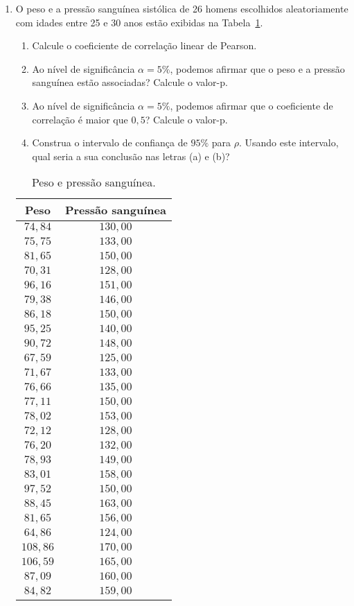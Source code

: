 \documentclass[8pt, a4paper]{article}
\begin{document}
\begin{enumerate}
	\item O peso e a pressão sanguínea sistólica de 26 homens escolhidos aleatoriamente com idades entre 25 e 30 anos estão exibidas na Tabela~\ref{tab:E11-8}.
	\begin{enumerate}
		\item Calcule o coeficiente de correlação linear de Pearson.
		\item Ao nível de significância $\alpha=5\%$, podemos afirmar que o peso e a pressão sanguínea estão associadas? Calcule o valor-p.
		\item Ao nível de significância $\alpha=5\%$, podemos afirmar que o coeficiente de correlação é maior que $0,5$? Calcule o valor-p.
		\item Construa o intervalo de confiança de $95\%$ para $\rho$. Usando este intervalo, qual seria a sua conclusão nas letras (a) e (b)?
	\end{enumerate}
	\begin{table}[htbp]
		\centering
		\caption{Peso e pressão sanguínea.}
		\label{tab:E11-8}
		\begin{tabular}{cc}
			\toprule
			\textbf{Peso} & \textbf{Pressão sanguínea} \\ 
			\midrule
			$74,84$ & $130,00$ \\ 
			$75,75$ & $133,00$ \\ 
			$81,65$ & $150,00$ \\ 
			$70,31$ & $128,00$ \\ 
			$96,16$ & $151,00$ \\ 
			$79,38$ & $146,00$ \\ 
			$86,18$ & $150,00$ \\ 
			$95,25$ & $140,00$ \\ 
			$90,72$ & $148,00$ \\ 
			$67,59$ & $125,00$ \\ 
			$71,67$ & $133,00$ \\ 
			$76,66$ & $135,00$ \\ 
			$77,11$ & $150,00$ \\ 
			$78,02$ & $153,00$ \\ 
			$72,12$ & $128,00$ \\ 
			$76,20$ & $132,00$ \\ 
			$78,93$ & $149,00$ \\ 
			$83,01$ & $158,00$ \\ 
			$97,52$ & $150,00$ \\ 
			$88,45$ & $163,00$ \\ 
			$81,65$ & $156,00$ \\ 
			$64,86$ & $124,00$ \\ 
			$108,86$ & $170,00$ \\ 
			$106,59$ & $165,00$ \\ 
			$87,09$ & $160,00$ \\ 
			$84,82$ & $159,00$ \\ 
			\bottomrule
		\end{tabular}
	\end{table}


\end{enumerate}
\end{document}
